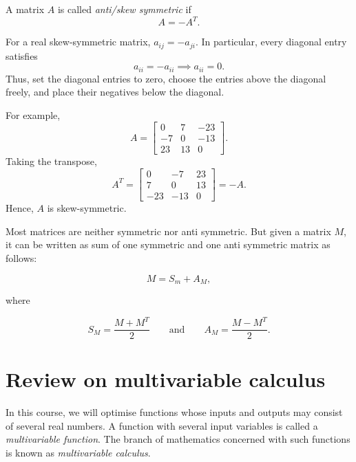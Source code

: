 \begin{definition}
	A matrix \( A \) is called  \emph{anti/skew symmetric} if
	\begin{equation}
		A = -A^T.
		\label{eq:anti-skew-symmetric-matrix-1}
	\end{equation}
\end{definition}

\begin{example}
	For a real skew-symmetric matrix,
	\(a_{ij}=-a_{ji}\). In particular, every
	diagonal entry satisfies
	\[
		a_{ii}=-a_{ii}
		\implies a_{ii}=0.
	\]
	Thus, set the diagonal entries to zero,
	choose the entries above the diagonal freely,
	and place their negatives below the diagonal.

	For example,
	\[
		A=
		\begin{bmatrix}
			0  & 7  & -23 \\
			-7 & 0  & -13 \\
			23 & 13 & 0
		\end{bmatrix}.
	\]
	Taking the transpose,
	\[
		A^T=
		\begin{bmatrix}
			0   & -7  & 23 \\
			7   & 0   & 13 \\
			-23 & -13 & 0
		\end{bmatrix}
		=-A.
	\]
	Hence, \(A\) is skew-symmetric.
\end{example}

Most matrices are neither symmetric nor anti symmetric. But given a matrix \( M \), it can be written as sum of one symmetric and one anti symmetric matrix as follows:

\begin{equation}
	M = S_m + A_M,
	\label{eq:symmetric-skew-symmetric-matrix-1}
\end{equation}

where

\begin{equation}
	S_M = \frac{M + M^T}{2}\qquad\text{and}\qquad A_M = \frac{M - M^T}{2}.
	\label{eq:symmetric-skew-symmetric-matrix-2}
\end{equation}

\section{Review on multivariable calculus}\label{sec:review-on-multivariable-calculus}

In this course, we will optimise functions whose inputs and outputs may consist of several real numbers. A function with several input variables is called a
\emph{multivariable function}. The branch of mathematics concerned with such functions is known as \emph{multivariable calculus}.

